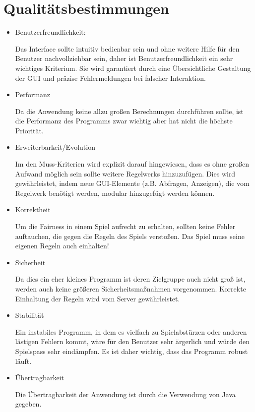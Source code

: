 \documentclass{article}
\begin{document}
\section{Qualitätsbestimmungen}

\begin{itemize}
\item Benutzerfreundlichkeit:

Das Interface sollte intuitiv bedienbar sein und ohne weitere Hilfe für den Benutzer nachvollziehbar sein, daher ist Benutzerfreundlichkeit ein sehr wichtiges Kriterium. Sie wird garantiert durch eine Übersichtliche Gestaltung der GUI und präzise Fehlermeldungen bei falscher Interaktion. 

\item Performanz

Da die Anwendung keine allzu großen Berechnungen durchführen sollte, ist die Performanz des Programms zwar wichtig aber hat nicht die höchste Priorität.

\item Erweiterbarkeit/Evolution

Im den Muss-Kriterien wird explizit darauf hingewiesen, dass es ohne großen Aufwand möglich sein sollte weitere \glspl{Regelwerk} hinzuzufügen. Dies wird gewährleistet, indem neue GUI-Elemente (z.B. Abfragen, Anzeigen), die vom \gls{Regelwerk} benötigt werden, modular hinzugefügt werden können.

\item Korrektheit

Um die Fairness in einem Spiel aufrecht zu erhalten, sollten keine Fehler auftauchen, die gegen die Regeln des Spiels verstoßen. Das Spiel muss seine eigenen Regeln auch einhalten!

\item Sicherheit

Da dies ein eher kleines Programm ist deren Zielgruppe auch nicht groß ist, werden auch keine größeren Sicherheitsmaßnahmen vorgenommen. Korrekte Einhaltung der Regeln wird vom \gls{Server} gewährleistet.

\item Stabilität

Ein instabiles Programm, in dem es vielfach zu Spielabstürzen oder anderen lästigen Fehlern kommt, wäre für den Benutzer sehr ärgerlich und würde den Spielspass sehr eindämpfen. Es ist daher wichtig, dass das Programm robust läuft.

\item Übertragbarkeit

Die Übertragbarkeit der Anwendung ist durch die Verwendung von Java gegeben.

\end{itemize}
\newpage
\printglossaries
\end{document}
